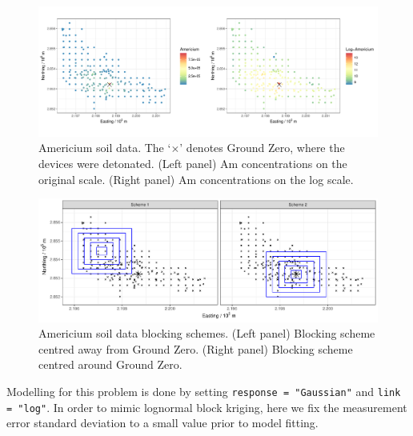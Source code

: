 \documentclass[12pt,a4paper]{article}
\begin{document}
\begin{figure}
    \centering
    \includegraphics[width = \linewidth]{Images/Americium_data.pdf}
    \caption{Americium soil data. The `$\times$' denotes Ground Zero, where the devices were detonated. (Left panel) Am concentrations on the original scale. (Right panel) Am concentrations on the log scale.  
}   
  \label{fig:Am_data}
\end{figure}


\begin{figure}
    \centering
    \includegraphics[width = \linewidth]{Images/Americium_blocking_schemes.pdf}
    \caption{Americium soil data blocking schemes. (Left panel) Blocking scheme centred away from Ground Zero. (Right panel) Blocking scheme centred around Ground Zero.
}   
  \label{fig:Am_blocking_schemes}
\end{figure}




Modelling for this problem is done by setting \texttt{response = "Gaussian"} and \texttt{link = "log"}. 
 In order to mimic lognormal block kriging, here we fix the measurement error standard deviation to a  small value prior to model fitting. 
\end{document}
